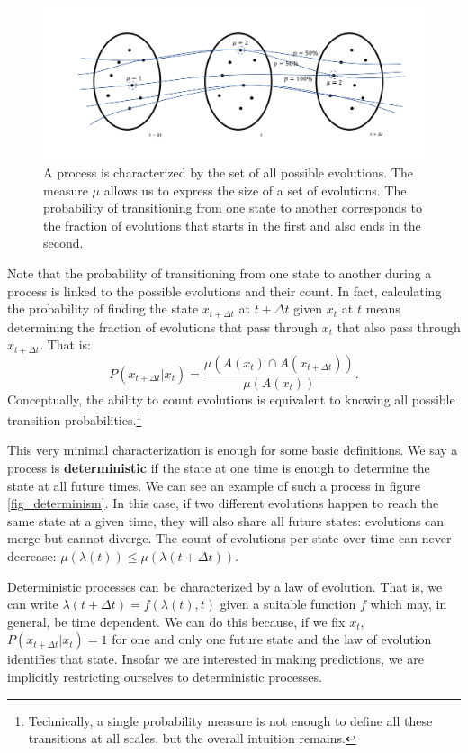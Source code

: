 \documentclass[letterpaper,twocolumn]{article}
\begin{document}
\begin{figure}[h]
	\includegraphics[width=\columnwidth]{images/Slide2.png}
	\caption{A process is characterized by the set of all possible evolutions. The measure $\mu$ allows us to express the size of a set of evolutions. The probability of transitioning from one state to another corresponds to the fraction of evolutions that starts in the first and also ends in the second.}\label{fig_process}
\end{figure}

Note that the probability of transitioning from one state to another during a process is linked to the possible evolutions and their count. In fact, calculating the probability of finding the state $x_{t+\Delta t}$ at $t+\Delta t$ given $x_t$ at $t$ means determining the fraction of evolutions that pass through $x_t$ that also pass through $x_{t+\Delta t}$. That is:
\begin{equation}
	P(x_{t+\Delta t} | x_t) = \frac{\mu(A(x_t) \cap A(x_{t+\Delta t}))}{\mu(A(x_t))}.
\end{equation}
Conceptually, the ability to count evolutions is equivalent to knowing all possible transition probabilities.\footnote{Technically, a single probability measure is not enough to define all these transitions at all scales, but the overall intuition remains.}

This very minimal characterization is enough for some basic definitions. We say a process is \textbf{deterministic} if the state at one time is enough to determine the state at all future times. We can see an example of such a process in figure \ref{fig_determinism}. In this case, if two different evolutions happen to reach the same state at a given time, they will also share all future states: evolutions can merge but cannot diverge. The count of evolutions per state over time can never decrease: $
\mu(\lambda(t)) \leq \mu(\lambda(t + \Delta t))$.

Deterministic processes can be characterized by a law of evolution. That is, we can write $\lambda(t+\Delta t) = f(\lambda(t), t)$ given a suitable function $f$ which may, in general, be time dependent. We can do this because, if we fix $x_t$, $P(x_{t+\Delta t} | x_t) = 1$ for one and only one future state and the law of evolution identifies that state. Insofar we are interested in making predictions, we are implicitly restricting ourselves to deterministic processes.
\end{document}
